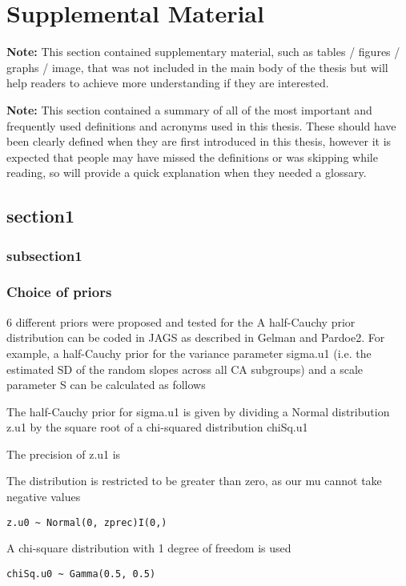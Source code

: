 
\chapter{Supplemental Material}

\textbf{Note:} This section contained supplementary material, such as tables / figures / graphs / image, that was not included in the main body of the thesis but will help readers to achieve more understanding if they are interested. 

\textbf{Note:} This section contained a summary of all of the most important and frequently used definitions and acronyms used in this thesis. These should have been clearly defined when they are first introduced in this thesis, however it is expected that people may have missed the definitions or was skipping while reading, so will provide a quick explanation when they needed a glossary. 


\section*{section1}
\subsection*{subsection1}

\subsection*{Choice of priors}

6 different priors were proposed and tested for the 
A half-Cauchy prior distribution can be coded in JAGS as described in Gelman and Pardoe2.
For example, a half-Cauchy prior for the variance parameter sigma.u1 (i.e. the estimated SD
of the random slopes across all CA subgroups) and a scale parameter S can be calculated as
follows

The half-Cauchy prior for sigma.u1 is given by dividing a Normal distribution z.u1
by the square root of a chi-squared distribution chiSq.u1


The precision of z.u1 is

The distribution is restricted to be greater than zero, as our mu cannot take negative values
\begin{lstlisting}
z.u0 ~ Normal(0, zprec)I(0,)
\end{lstlisting}
A chi-square distribution with 1 degree of freedom is used

\begin{lstlisting}
chiSq.u0 ~ Gamma(0.5, 0.5)
\end{lstlisting}

